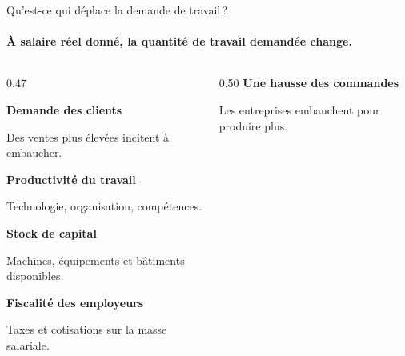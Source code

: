 \documentclass[aspectratio=169]{beamer}
\begin{document}
\begin{frame}{Qu'est-ce qui déplace la demande de travail\,?}\examtag
   \framesubtitle{À salaire réel donné, la quantité de travail demandée change.}
   \begin{columns}[c,onlytextwidth]
      \begin{column}{0.47\textwidth}
         \begin{tcolorbox}[colback=HECcoral!6, colframe=HECcoral!6, boxrule=0pt, arc=7pt, left=9pt, right=9pt, top=7pt, bottom=7pt, before skip=0pt, after skip=0pt]
            \RaggedRight\footnotesize{}
            \textbf{\textcolor{HECcoral}{Demande des clients}}\par
            Des ventes plus élevées incitent à embaucher.\par\smallskip
            \textbf{\textcolor{HECcoral}{Productivité du travail}}\par
            Technologie, organisation, compétences.\par\smallskip
            \textbf{\textcolor{HECcoral}{Stock de capital}}\par
            Machines, équipements et bâtiments disponibles.\par\smallskip
            \textbf{\textcolor{HECcoral}{Fiscalité des employeurs}}\par
            Taxes et cotisations sur la masse salariale.
         \end{tcolorbox}
      \end{column}
      \begin{column}{0.50\textwidth}
         \centering
         {\small\bfseries\textcolor{HECnavy}{Une hausse des commandes}}\par\smallskip
         \par\smallskip
         {\footnotesize Les entreprises embauchent pour produire plus.\par}
      \end{column}
   \end{columns}
\end{frame}
\end{document}
